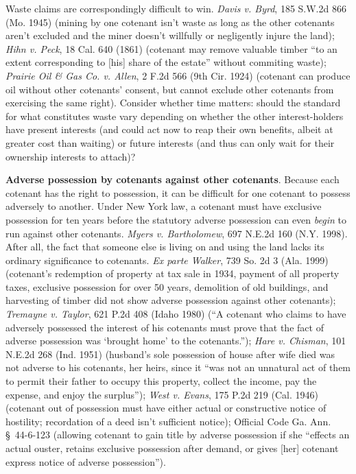 Waste claims are correspondingly difficult to win. \emph{Davis v. Byrd}, 185
S.W.2d 866 (Mo. 1945) (mining by one cotenant isn't waste as long as the other
cotenants aren't excluded and the miner doesn't willfully or negligently injure
the land); \emph{Hihn v. Peck}, 18 Cal. 640 (1861) (cotenant may remove valuable
timber ``to an extent corresponding to [his] share of the estate'' without
commiting waste); \emph{Prairie Oil \& Gas Co. v. Allen}, 2 F.2d 566 (9th Cir.
1924) (cotenant can produce oil without other cotenants' consent, but cannot
exclude other cotenants from exercising the same right). Consider whether time
matters: should the standard for what constitutes waste vary depending on
whether the other interest-holders have present interests (and could act now to
reap their own benefits, albeit at greater cost than waiting) or future
interests (and thus can only wait for their ownership interests to attach)?

\item \textbf{Adverse possession by cotenants against other cotenants}. Because
each cotenant has the right to possession, it can be difficult for one cotenant
to possess adversely to another. Under New York law, a cotenant must have
exclusive possession for ten years before the statutory adverse possession can
even \textit{begin} to run against other cotenants. \emph{Myers v. Bartholomew},
697 N.E.2d 160 (N.Y. 1998). After all, the fact that someone else is living on
and using the land lacks its ordinary significance to cotenants. \emph{Ex parte
Walker}, 739 So. 2d 3 (Ala. 1999) (cotenant's redemption of property at tax sale
in 1934, payment of all property taxes, exclusive possession for over 50 years,
demolition of old buildings, and harvesting of timber did not show adverse
possession against other cotenants); \emph{Tremayne v. Taylor}, 621 P.2d 408
(Idaho 1980) (``A cotenant who claims to have adversely possessed the interest
of his cotenants must prove that the fact of adverse possession was `brought
home' to the cotenants.''); \emph{Hare v. Chisman}, 101 N.E.2d 268 (Ind. 1951)
(husband's sole possession of house after wife died was not adverse to his
cotenants, her heirs, since it ``was not an unnatural act of them to permit
their father to occupy this property, collect the income, pay the expense, and
enjoy the surplus''); \emph{West v. Evans}, 175 P.2d 219 (Cal. 1946) (cotenant
out of possession must have either actual or constructive notice of hostility;
recordation of a deed isn't sufficient notice); Official Code Ga. Ann.
\S~44-6-123 (allowing cotenant to gain title by adverse possession if she
``effects an actual ouster, retains exclusive possession after demand, or gives
[her] cotenant express notice of adverse possession'').

